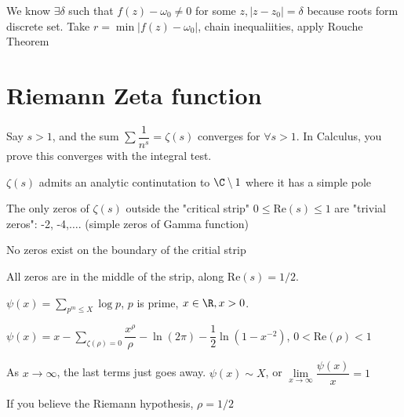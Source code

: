 \documentclass[twoside, 10pt]{article}
\renewcommand{\Re}{\text{Re}}
\begin{document}
We know $\exists \delta$ such that $f(z) - \omega_0 \neq 0$ for some $z, |z-z_0| = \delta$ because roots form discrete set. Take $r = \min|f(z) - \omega_0|$, chain inequaliities, apply Rouche Theorem %


\section{Riemann Zeta function}
Say $s > 1$, and the sum $\sum\dfrac{1}{n^s} = \zeta(s)$ converges for $\forall s > 1$. In Calculus, you prove this converges with the integral test.

\begin{thm}
   $\zeta(s)$ admits an analytic continutation to $\C \setminus 1$ where it has a simple pole
\end{thm}

\begin{thm}
   The only zeros of $\zeta(s)$ outside the "critical strip" $0 \leq \Re(s) \leq 1$ are "trivial zeros": -2, -4,$\ldots$. (simple zeros of Gamma function)
\end{thm}

\begin{thm}
   No zeros exist on the boundary of the critial strip
\end{thm}

\begin{thm}
   All zeros are in the middle of the strip, along $\Re(s) = 1/2$.
\end{thm}

\begin{defn}
   $\psi(x) = \sum\limits_{p^m \leq X} \log p$, $p$ is prime, $x \in \R, x > 0$.
\end{defn}

\begin{defn}
   $\psi(x) = x - \sum\limits_{\zeta(\rho) = 0}\dfrac{x^\rho}{\rho} - \ln(2\pi) - \dfrac{1}{2}\ln(1-x^{-2})$, $0 < \Re(\rho) < 1$
\end{defn}

\begin{defn}
   As $x\to\infty$, the last terms just goes away. $\psi(x) \sim X$, or $\lim\limits_{x\to\infty} \dfrac{\psi(x)}{x} = 1$
\end{defn}

If you believe the Riemann hypothesis, $\rho = 1/2$
\end{document}
